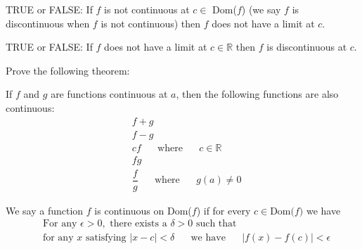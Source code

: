 \begin{exercise}
TRUE or FALSE: If $f$ is not continuous at $c \in$ Dom($f$) (we say $f$ is discontinuous when $f$ is not continuous) then $f$ does not have a limit at $c$.
\end{exercise}

\begin{exercise}
TRUE or FALSE: If $f$ does not have a limit at $c \in \mathbb{R}$  then $f$ is discontinuous at $c$.
\end{exercise}

\begin{exercise}
Prove the following theorem:
\begin{theorem}
If $f$ and $g$ are functions continuous at $a$, then the following functions are also continuous:
\begin{align*}
    &f + g\\[2ex]
    &f - g\\[2ex]
    &cf \hspace{20pt} \text{where} \hspace{20pt} c \in \mathbb{R}\\[2ex]
    &fg\\[2ex]
    &\dfrac{f}{g} \hspace{20pt} \text{where} \hspace{20pt} g(a) \neq 0
\end{align*}
\end{theorem}
\end{exercise}

\begin{definition}
We say a function $f$ is continuous on Dom($f$) if for every $c \in \text{Dom($f$)}$ we have 
\begin{align*}
    &\text{For any} \hspace{4pt} \epsilon > 0, \hspace{4pt} \text{there exists a} \hspace{4pt} \delta > 0 \hspace{4pt} \text{such that}\\[2ex]
    &\text{for any} \hspace{4pt} x \hspace{4pt} \text{satisfying} \hspace{4pt} \lvert x - c \rvert < \delta \hspace{20pt} \text{we have} \hspace{20pt} \lvert f(x) - f(c) \rvert < \epsilon
\end{align*}
\end{definition}

